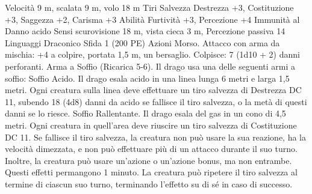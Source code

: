 \begin{multicols}{2}
Velocità 9 m, scalata 9 m, volo 18 m
Tiri Salvezza Destrezza +3, Costituzione +3, Saggezza +2, Carisma +3
Abilità Furtività +3, Percezione +4
Immunità al Danno acido
Sensi scurovisione 18 m, vista cieca 3 m, Percezione passiva 14
Linguaggi Draconico
Sfida 1 (200 PE)
Azioni
Morso. Attacco con arma da mischia: +4 a colpire, portata 1,5
m, un bersaglio.
Colpisce: 7 (1d10 + 2) danni perforanti.
Arma a Soffio (Ricarica 5-6). Il drago usa una delle seguenti armi
a soffio:
Soffio Acido. Il drago esala acido in una linea lunga 6 metri e larga
1,5 metri. Ogni creatura sulla linea deve effettuare un tiro salvezza di
Destrezza DC 11, subendo 18 (4d8) danni da acido se fallisce il tiro
salvezza, o la metà di questi danni se lo riesce.
Soffio Rallentante. Il drago esala del gas in un cono di 4,5 metri.
Ogni creatura in quell’area deve riuscire un tiro salvezza di
Costituzione DC 11. Se fallisce il tiro salvezza, la creatura non può
usare la sua reazione, ha la velocità dimezzata, e non può effettuare
più di un attacco durante il suo turno. Inoltre, la creatura può usare
un’azione o un’azione bonus, ma non entrambe. Questi effetti
permangono 1 minuto. La creatura può ripetere il tiro salvezza al
termine di ciascun suo turno, terminando l’effetto su di sé in caso di
successo.
 

\end{multicols}
